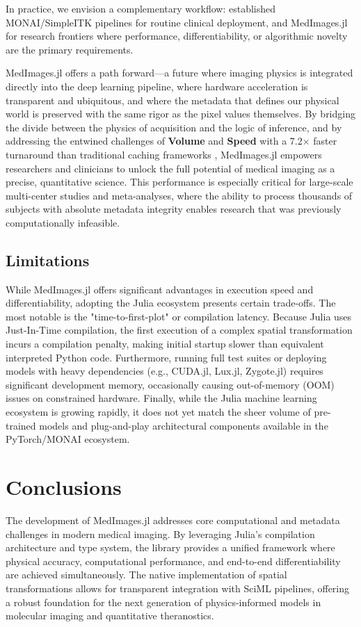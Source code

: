 \documentclass[10pt,letterpaper]{article}
\begin{document}
\begin{itemize}
\end{itemize}

In practice, we envision a complementary workflow: established MONAI/SimpleITK pipelines for routine clinical deployment, and MedImages.jl for research frontiers where performance, differentiability, or algorithmic novelty are the primary requirements.

MedImages.jl offers a path forward---a future where imaging physics is integrated directly into the deep learning pipeline, where hardware acceleration is transparent and ubiquitous, and where the metadata that defines our physical world is preserved with the same rigor as the pixel values themselves. By bridging the divide between the physics of acquisition and the logic of inference, and by addressing the entwined challenges of \textbf{Volume} and \textbf{Speed} with a 7.2$\times$ faster turnaround than traditional caching frameworks \cite{Shi_2023}, MedImages.jl empowers researchers and clinicians to unlock the full potential of medical imaging as a precise, quantitative science. This performance is especially critical for large-scale multi-center studies and meta-analyses, where the ability to process thousands of subjects with absolute metadata integrity enables research that was previously computationally infeasible.


\subsection*{Limitations}
While MedImages.jl offers significant advantages in execution speed and differentiability, adopting the Julia ecosystem presents certain trade-offs. The most notable is the "time-to-first-plot" or compilation latency. Because Julia uses Just-In-Time compilation, the first execution of a complex spatial transformation incurs a compilation penalty, making initial startup slower than equivalent interpreted Python code. Furthermore, running full test suites or deploying models with heavy dependencies (e.g., CUDA.jl, Lux.jl, Zygote.jl) requires significant development memory, occasionally causing out-of-memory (OOM) issues on constrained hardware. Finally, while the Julia machine learning ecosystem is growing rapidly, it does not yet match the sheer volume of pre-trained models and plug-and-play architectural components available in the PyTorch/MONAI ecosystem.

\section{Conclusions}
The development of MedImages.jl addresses core computational and metadata challenges in modern medical imaging. By leveraging Julia's compilation architecture and type system, the library provides a unified framework where physical accuracy, computational performance, and end-to-end differentiability are achieved simultaneously. The native implementation of spatial transformations allows for transparent integration with SciML pipelines, offering a robust foundation for the next generation of physics-informed models in molecular imaging and quantitative theranostics.
\end{document}
